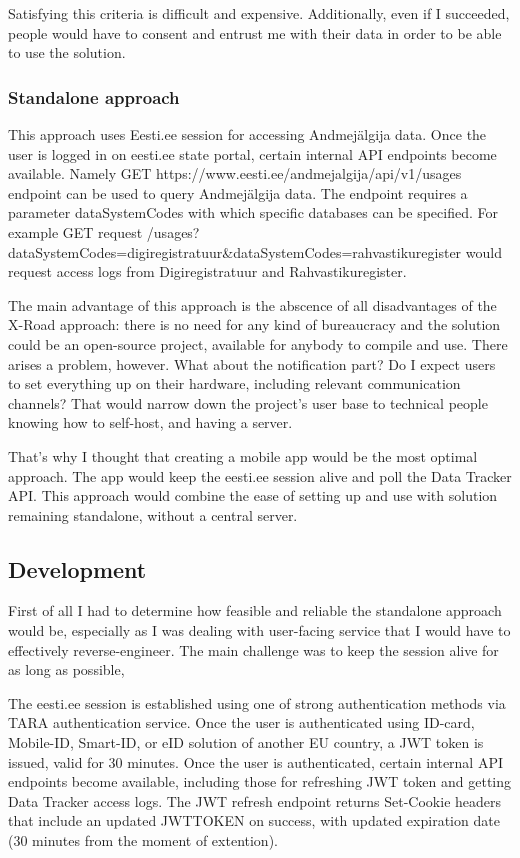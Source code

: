 Satisfying this criteria is difficult and expensive. Additionally, even if I succeeded, people would have to consent and entrust me with their data in order to be able to use the solution.

\subsubsection{Standalone approach}
This approach uses Eesti.ee session for accessing Andmejälgija data. Once the user is logged in on eesti.ee state portal, certain internal API endpoints become available. Namely GET https://www.eesti.ee/andmejalgija/api/v1/usages endpoint can be used to query Andmejälgija data. The endpoint requires a parameter dataSystemCodes with which specific databases can be specified. For example GET request /usages?dataSystemCodes=digiregistratuur\&dataSystemCodes=rahvastikuregister would request access logs from Digiregistratuur and Rahvastikuregister.

The main advantage of this approach is the abscence of all disadvantages of the X-Road approach: there is no need for any kind of bureaucracy and the solution could be an open-source project, available for anybody to compile and use. There arises a problem, however. What about the notification part? Do I expect users to set everything up on their hardware, including relevant communication channels? That would narrow down the project's user base to technical people knowing how to self-host, and having a server.

That's why I thought that creating a mobile app would be the most optimal approach. The app would keep the eesti.ee session alive and poll the Data Tracker API. This approach would combine the ease of setting up and use with solution remaining standalone, without a central server.

\subsection{Development}

First of all I had to determine how feasible and reliable the standalone approach would be, especially as I was dealing with user-facing service that I would have to effectively reverse-engineer. The main challenge was to keep the session alive for as long as possible,

The eesti.ee session is established using one of strong authentication methods via TARA authentication service. Once the user is authenticated using ID-card, Mobile-ID, Smart-ID, or eID solution of another EU country, a JWT token is issued, valid for 30 minutes. Once the user is authenticated, certain internal API endpoints become available, including those for refreshing JWT token and getting Data Tracker access logs. The JWT refresh endpoint returns Set-Cookie headers that include an updated JWTTOKEN on success, with updated expiration date (30 minutes from the moment of extention).

